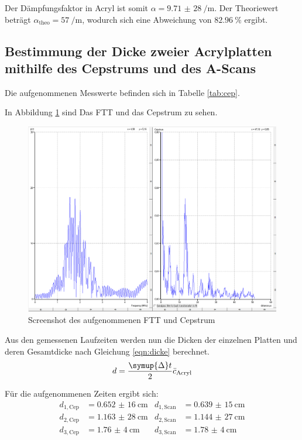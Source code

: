 Der Dämpfungsfaktor in Acryl ist somit $\alpha = \SI{9,71(28)}{\per \m}$. Der Theoriewert \cite{sample4} beträgt $\alpha_\text{theo} = \SI{57}{\per \m}$,
wodurch sich eine Abweichung von $\SI{82,96}{\%}$ ergibt.

\subsection{Bestimmung der Dicke zweier Acrylplatten mithilfe des Cepstrums und des A-Scans \label{sec:cep}}

Die aufgenommenen Messwerte befinden sich in Tabelle \ref{tab:cep}.


In Abbildung \ref{fig:cep} sind Das FTT und das Cepstrum zu sehen.
\begin{figure}[H]
  \centering
  \includegraphics[width=\textwidth]{Text/Bilder/FTT,Cep.png}
  \caption{Screenshot des aufgenommenen FTT und Cepstrum}
  \label{fig:cep}
\end{figure}

Aus den gemessenen Laufzeiten werden nun die Dicken der einzelnen Platten und deren Gesamtdicke nach Gleichung \eqref{eqn:dicke} berechnet.
\begin{equation}
  d = \frac{\symup{\Delta}t}{2} \bar{c}_\text{Acryl}
  \label{eqn:dicke}
\end{equation}

Für die aufgenommenen Zeiten ergibt sich:
\begin{align*}
  d_{1, \text{Cep}} &= \SI{0,652(16)}{\cm} & d_{1, \text{Scan}} &= \SI{0,639(15)}{\cm} \\
  d_{2, \text{Cep}} &= \SI{1,163(28)}{\cm} & d_{2, \text{Scan}} &= \SI{1,144(27)}{\cm} \\
  d_{3, \text{Cep}} &= \SI{1,76(4)}{\cm} & d_{3, \text{Scan}} &= \SI{1,78(4)}{\cm}
\end{align*}

